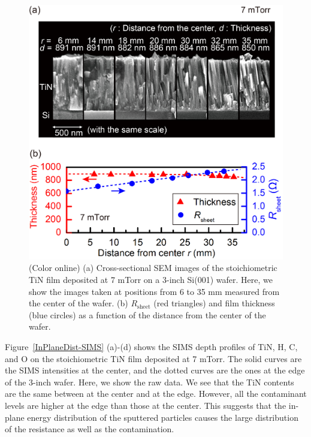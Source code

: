 \begin{figure}
\begin{center}
\includegraphics[width=125mm]{InPlaneDist.jpg}
\end{center}

\caption{(Color online) (a) Cross-sectional SEM images of the stoichiometric TiN film deposited at 7 mTorr on a 3-inch Si(001) wafer. Here, we show the images taken at positions from 6 to 35 mm measured from the center of the wafer. (b) $R$$_{\text{sheet}}$ (red triangles) and film thickness (blue circles) as a function of the distance from the center of the wafer.}
\label{InPlaneDist}
\end{figure}
Figure \,\ref{InPlaneDist-SIMS} (a)-(d) shows the SIMS depth profiles of TiN, H, C, and O on the stoichiometric TiN film deposited at 7 mTorr. The solid curves are the SIMS intensities at the center, and the dotted curves are the ones at the edge of the 3-inch wafer. Here, we show the raw data. We see that the TiN contents are the same between at the center and at the edge. However, all the contaminant levels are higher at the edge than those at the center.  This suggests that the in-plane energy distribution of the sputtered particles causes the large distribution of the resistance as well as the contamination.

